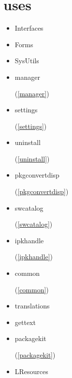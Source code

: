 \documentclass{report}
\begin{document}
\section{uses}
\begin{itemize}
\item \begin{ttfamily}Interfaces\end{ttfamily}\item \begin{ttfamily}Forms\end{ttfamily}\item \begin{ttfamily}SysUtils\end{ttfamily}\item \begin{ttfamily}manager\end{ttfamily}(\ref{manager})\item \begin{ttfamily}settings\end{ttfamily}(\ref{settings})\item \begin{ttfamily}uninstall\end{ttfamily}(\ref{uninstall})\item \begin{ttfamily}pkgconvertdisp\end{ttfamily}(\ref{pkgconvertdisp})\item \begin{ttfamily}swcatalog\end{ttfamily}(\ref{swcatalog})\item \begin{ttfamily}ipkhandle\end{ttfamily}(\ref{ipkhandle})\item \begin{ttfamily}common\end{ttfamily}(\ref{common})\item \begin{ttfamily}translations\end{ttfamily}\item \begin{ttfamily}gettext\end{ttfamily}\item \begin{ttfamily}packagekit\end{ttfamily}(\ref{packagekit})\item \begin{ttfamily}LResources\end{ttfamily}\end{itemize}
\end{document}
